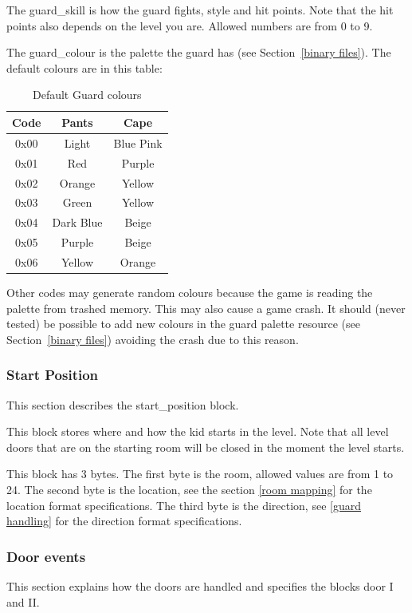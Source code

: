 \documentclass{article}
\begin{document}
 The guard\_skill is how the guard fights, style and hit points. Note that
 the hit points also depends on the level you are. Allowed numbers are from
 0 to 9.


 The guard\_colour is the palette the guard has (see Section~\ref{binary files}).
 The default colours are in this table:

\begin{table}
\begin{tabular}{ccc}
\hline
Code & Pants    & Cape \\
\hline
0x00 & Light    & Blue Pink \\
0x01 & Red      & Purple \\
0x02 & Orange   & Yellow \\
0x03 & Green    & Yellow \\
0x04 & Dark Blue& Beige \\
0x05 & Purple   & Beige \\
0x06 & Yellow   & Orange \\
\hline
\end{tabular}
\caption{Default Guard colours}
\label{palettes table}
\end{table}

 Other codes may generate random colours because the game is reading
 the palette from trashed memory. This may also cause a game crash.
 It should (never tested) be possible to add new colours in the guard
 palette resource (see Section~\ref{binary files}) avoiding the crash due to this reason.


\subsubsection{Start Position \label{start position}} %
 This section describes the start\_position block.

 This block stores where and how the kid starts in the level. Note that all
 level doors that are on the starting room will be closed in the moment
 the level starts.

 This block has 3 bytes.
 The first byte is the  room, allowed values are from 1 to 24.
 The second byte is the  location, see the section \ref{room mapping} for the location
 format specifications.
 The third byte is the  direction, see \ref{guard handling} for the direction format
 specifications.

\subsubsection{Door events\label{door events}} %
 This section explains how the doors are handled and specifies the blocks
 door I and II.
\end{document}
